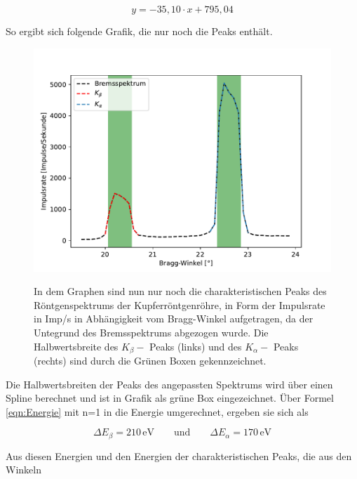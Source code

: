 \documentclass[titlepage = firstcover]{scrartcl}
\begin{document}
            \begin{equation*}
              y = -35,10 \cdot x + 795,04
            \end{equation*}

            \noindent
            So ergibt sich folgende Grafik, die nur noch die Peaks enthält.
            \FloatBarrier
            \begin{figure}[h]
              \centering
              \caption{In dem Graphen sind nun nur noch die charakteristischen Peaks des Röntgenspektrums der Kupferröntgenröhre, in Form der Impulsrate in Imp/s in Abhängigkeit vom Bragg-Winkel aufgetragen, da der Untegrund des Bremsspektrums abgezogen wurde. Die Halbwertsbreite des $K_{\beta}-$ Peaks (links) und des $K_{\alpha}-$ Peaks (rechts) sind durch die Grünen Boxen gekennzeichnet.}
              \includegraphics{Peaks_Cu.pdf}
              \label{fig:graphpeak}
            \end{figure}
            \FloatBarrier
            \noindent
            Die Halbwertsbreiten der Peaks des angepassten Spektrums wird über einen Spline berechnet und ist in Grafik als grüne Box eingezeichnet. Über Formel \ref{eqn:Energie} mit n=1 in die 
            Energie umgerechnet, ergeben sie sich als 

            \begin{equation*}
              \Delta E_{\beta} = 210 \, \text{eV} \qquad \text{und} \qquad \Delta E_{\alpha} = 170 \, \text{eV}
              \label{eqn:Breiten}
            \end{equation*}
            
            \noindent
            Aus diesen Energien und den Energien der charakteristischen Peaks, die aus den Winkeln
\end{document}
